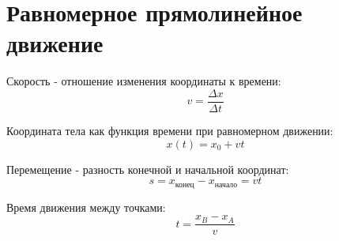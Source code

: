 \documentclass{article}
\begin{document}
\section*{Равномерное прямолинейное движение}

Скорость - отношение изменения координаты к времени:
\[v = \frac{\Delta x}{\Delta t}\]

Координата тела как функция времени при равномерном движении:
\[x(t) = x_0 + vt\]

Перемещение - разность конечной и начальной координат:
\[s = x_{\text{конец}} - x_{\text{начало}} = vt\]

Время движения между точками:
\[t = \frac{x_B - x_A}{v}\]
\end{document}
